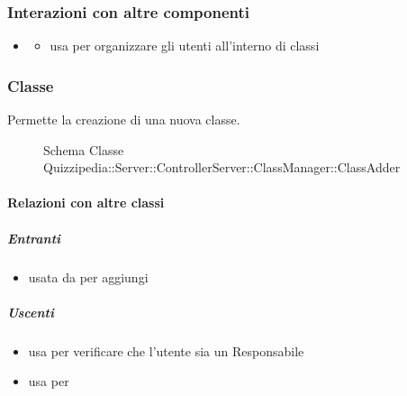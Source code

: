 \subsubsection{Interazioni con altre componenti}
\begin{itemize}
\item {}
\begin{itemize}
\item usa  per organizzare gli utenti all'interno di classi
\end{itemize}
\end{itemize}
\subsubsection{Classe }
Permette la creazione di una nuova classe.
\begin{figure}[H]
\centering
\noindent{}
\caption[Schema Classe ClassAdder]{Schema Classe Quizzipedia::Server::ControllerServer::ClassManager::ClassAdder}
\end{figure}
\paragraph{Relazioni con altre classi}
\subparagraph{Entranti}
\begin{itemize}
\item usata da  per aggiungi
\end{itemize}
\subparagraph{Uscenti}
\begin{itemize}
\item usa  per verificare che l'utente sia un Responsabile
\item usa  per 
\end{itemize}
